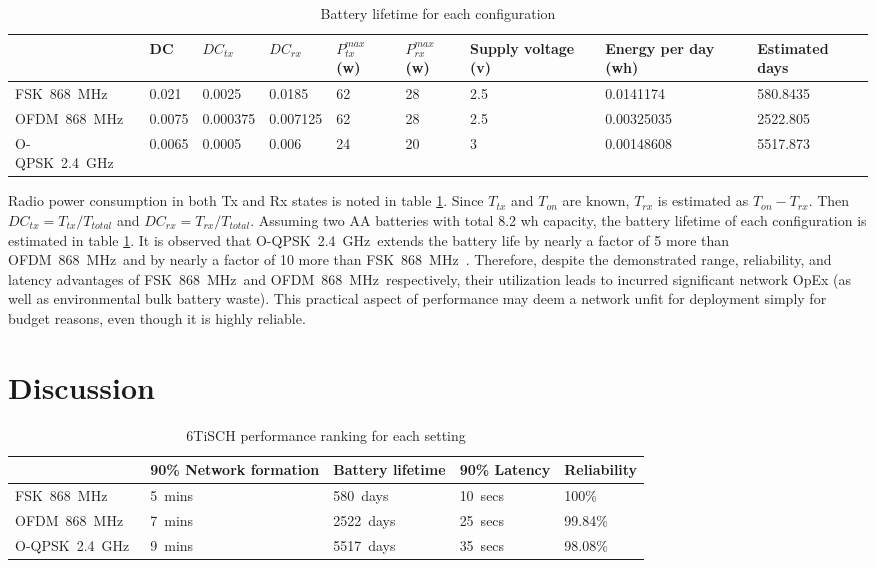 \documentclass[journal,article,submit,moreauthors,pdftex]{Definitions/mdpi}
\newcommand{\fsk}          {FSK~868~MHz}
\newcommand{\oqpsk}        {O-QPSK~2.4~GHz}
\newcommand{\ofdm}         {OFDM~868~MHz}
\begin{document}
\begin{table}[]
\centering
\begin{tabular}{|l|l|l|l|l|l|l|l|l|}
\hline
        & DC     & $DC_{tx}$ & $DC_{rx}$ & $P_{tx}^{max}$ (w) & $P_{rx}^{max}$(w) & Supply voltage (v) & Energy per day (wh) & \textbf{Estimated days} \\ \hline
\fsk\   & 0.021  & 0.0025    & 0.0185    & 62             & 28             & 2.5            & 0.0141174           & 580.8435       \\ \hline
\ofdm\  & 0.0075 & 0.000375  & 0.007125  & 62             & 28             & 2.5            & 0.00325035          & 2522.805       \\ \hline
\oqpsk\ & 0.0065 & 0.0005    & 0.006     & 24             & 20             & 3              & 0.00148608          & 5517.873       \\ \hline
\end{tabular}
\caption{Battery lifetime for each configuration}
\label{tab:energy_table}
\end{table}


Radio power consumption in both Tx and Rx states is noted in table \ref{tab:energy_table}.
Since $T_{tx}$ and $T_{on}$ are known, $T_{rx}$ is estimated as $T_{on}-T_{rx}$.
Then $DC_{tx}=T_{tx}/T_{total}$ and $DC_{rx}=T_{rx}/T_{total}$.
Assuming two AA batteries with total 8.2 wh capacity, the battery lifetime of each configuration is estimated in table \ref{tab:energy_table}.
It is observed that \oqpsk\ extends the battery life by nearly a factor of 5 more than \ofdm\ and by nearly a factor of 10  more than \fsk\ .
Therefore, despite the demonstrated range, reliability, and latency advantages of \fsk\ and \ofdm\ respectively, their utilization leads to incurred significant network OpEx (as well as environmental bulk battery waste).
This practical aspect of performance may deem a network unfit for deployment simply for budget reasons, even though it is highly reliable. 

\section{Discussion}
\label{sec:discussion}

\begin{table}[]
    \centering
    \begin{tabular}{|l|l|l|l|l|}
        \hline
                & 90\% Network formation & Battery lifetime & 90\% Latency  &  Reliability   \\ \hline
        \fsk\   & 5~mins                 & 580~days      & 10~secs       & 100\%             \\ \hline
        \ofdm\  & 7~mins                 & 2522~days     & 25~secs       & 99.84\%           \\ \hline
        \oqpsk\ & 9~mins                 & 5517~days     & 35~secs       & 98.08\%           \\ \hline
    \end{tabular}
    \caption{6TiSCH performance ranking for each setting}
    \label{tab:summary}
\end{table}
\end{document}
